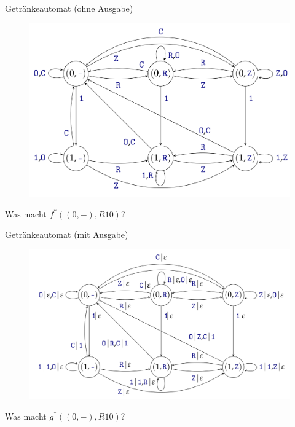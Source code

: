 \begin{frame}{Getränkeautomat (ohne Ausgabe)}
    \begin{figure}[htbp]
        \centering
        \includegraphics[width=.80\textwidth,height=.8\textheight,keepaspectratio]{graphics/10/getraenke.png}
    \end{figure}
    Was macht $f^*\left( \left( 0,- \right), R10 \right)$? \pause{} \pause {}
\end{frame}
\begin{frame}{Getränkeautomat (mit Ausgabe)}
    \begin{figure}[htbp]
        \centering
        \includegraphics[width=.80\textwidth,height=.8\textheight,keepaspectratio]{graphics/10/getraenke2.png}
    \end{figure}
    Was macht $g^*\left( \left( 0,- \right), R10 \right)$? \pause{} \pause {} \pause {}
\end{frame}
